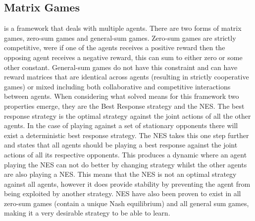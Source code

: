 \documentclass[conference]{IEEEtran}
\begin{document}
\subsection{Matrix Games} is a framework that deals with multiple agents\cite{basar1999dynamic}. There are two forms of matrix games, zero-sum games and general-sum games. Zero-sum games are strictly competitive, were if one of the agents receives a positive reward then the opposing agent receives a negative reward, this can sum to either zero or some other constant. General-sum games do not have this constraint and can have reward matrices that are identical across agents (resulting in strictly cooperative games) or mixed including both collaborative and competitive interactions between agents. When considering what solved means for this framework two properties emerge, they are the Best Response strategy and the NES\cite{basar1999dynamic}. The best response strategy is the optimal strategy against the joint actions of all the other agents. In the case of playing against a set of stationary opponents there will exist a deterministic best response strategy. The NES takes this one step further and states that all agents should be playing a best response against the joint actions of all its respective opponents. This produces a dynamic where an agent playing the NES can not do better by changing strategy whilst the other agents are also playing a NES. This means that the NES is not an optimal strategy against all agents, however it does provide stability by preventing the agent from being exploited by another strategy. NES have also been proven to exist in all zero-sum games (contain a unique Nash equilibrium) and all general sum games, making it a very desirable strategy to be able to learn.
\end{document}
